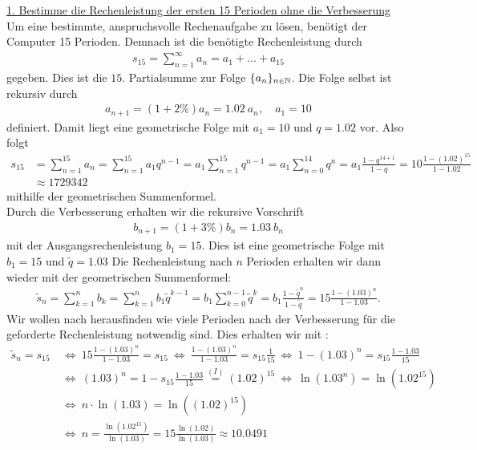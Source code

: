\underline{1. Bestimme die Rechenleistung der ersten 15 Perioden ohne die Verbesserung}\\
Um eine bestimmte, anspruchsvolle Rechenaufgabe zu lösen, benötigt der Computer 15 Perioden. Demnach ist die benötigte Rechenleistung durch
\begin{align*}
	s_{15}
	=
	\sum \limits_{n = 1}^\infty a_n 
	=
	a_1 +...+ a_{15}
\end{align*}
gegeben. Dies ist die $ 15. $ Partialsumme zur Folge $ \{a_n\}_{n \in \mathbb{N}} $.
Die Folge selbst ist rekursiv durch
\begin{align*}
	a_{n+1} = (1+ 2 \%) a_n = 1.02 \ a_n, \quad a_1 = 10
\end{align*}
definiert. Damit liegt eine geometrische Folge mit $ a_1  = 10$ und $ q =1.02 $ vor.
Also folgt
\begin{align*}
	s_{15}
	&=
	\sum \limits_{n = 1}^{15} a_n 
	=
	\sum \limits_{n = 1}^{15} a_1 q^{n-1} 
	=
	a_1 \sum \limits_{n = 1}^{15}  q^{n-1} 
	=
	a_1 \sum \limits_{n = 0}^{14}  q^{n}
	=
	a_1 \frac{1 - q^{14 + 1}}{1- q} 
	=
	10 \frac{1 - (1.02)^{15}}{1 - 1.02}\\
	&\approx 1729342
\end{align*}
mithilfe der geometrischen Summenformel.\\
Durch die Verbesserung erhalten wir die rekursive Vorschrift
\begin{align*}
	b_{n+1} = (1 + 3\%) b_n = 1.03 \ b_n
\end{align*}
mit der Ausgangsrechenleistung $ b_1 = 15 $. Dies ist eine geometrische Folge mit $ b_1 = 15 $ und $ \tilde{q} = 1.03 $
Die Rechenleistung nach $ n $ Perioden erhalten wir dann wieder mit der geometrischen Summenformel:
\begin{align*}
	\tilde{s}_n
	=
	\sum \limits_{k = 1}^n b_k
	=
	\sum \limits_{k = 1}^n b_1 \tilde{q}^{k-1}
	=
	b_1 \sum \limits_{k = 0}^{n-1}  \tilde{q}^{k}
	=
	b_1 \frac{1 - \tilde{q}^{n}}{1- \tilde{q}}
	=
	15 \frac{1 - (1.03)^n}{1- 1.03}.
\end{align*}
Wir wollen nach herausfinden wie viele Perioden nach der Verbesserung für die geforderte Rechenleistung notwendig sind.
Dies erhalten wir mit :
\begin{align*}
	\tilde{s}_n = s_{15}
	\ &\Leftrightarrow \
	15 \frac{1 - (1.03)^n}{1- 1.03} = s_{15}
	\ \Leftrightarrow \ 
	\frac{1 - (1.03)^n}{1- 1.03} = s_{15} \frac{1}{15}
	\ \Leftrightarrow \ 
	1 - (1.03)^n = s_{15} \frac{1- 1.03}{15}\\
	\ &\Leftrightarrow \ 
	 (1.03)^n = 1 -  s_{15} \frac{1- 1.03}{15}
	 \overset{(I)}{=}
	(1.02)^{15} 
	\ \Leftrightarrow \ 
	\ln(1.03^n) =  \ln (1.02^{15})\\
	\ &\Leftrightarrow \ 
	n \cdot \ln(1.03) =  \ln ((1.02)^{15})\\
	\ &\Leftrightarrow \ 
	n =  \frac{\ln (1.02^{15})}{\ln(1.03)}
	=15 \frac{\ln(1.02)}{\ln(1.03)}
	\approx 10.0491
\end{align*}
